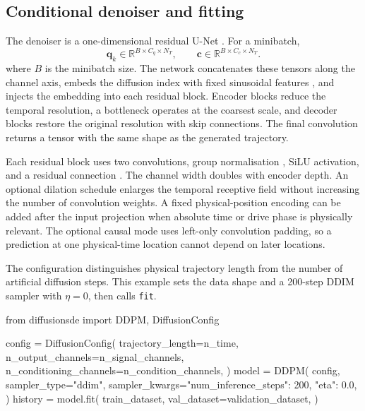 \subsection{Conditional denoiser and fitting}

The denoiser is a one-dimensional residual U-Net \cite{ronneberger2015unet}.
For a minibatch,
\begin{equation}
    \mathbf{q}_k\in\mathbb{R}^{B\times C_q\times N_T},
    \qquad
    \mathbf{c}\in\mathbb{R}^{B\times C_c\times N_T}.
    \label{eq:denoiser_tensor_shapes}
\end{equation}
where $B$ is the minibatch size. The network concatenates these tensors along the
channel axis, embeds the
diffusion index with fixed
sinusoidal features \cite{vaswani2017attention}, and injects the embedding into
each residual block. Encoder blocks reduce the temporal resolution, a bottleneck
operates at the coarsest scale, and decoder blocks restore the original resolution
with skip connections. The final convolution returns a tensor with the same shape
as the generated trajectory.

Each residual block uses two convolutions, group normalisation
\cite{wu2018groupnorm}, SiLU activation, and a residual connection
\cite{he2016residual}. The channel width doubles with encoder depth. An optional
dilation schedule enlarges the temporal receptive field without increasing the
number of convolution weights. A fixed physical-position encoding can be added
after the input projection when absolute time or drive phase is physically
relevant. The optional causal mode uses left-only convolution padding, so a
prediction at one physical-time location cannot depend on later locations.

The configuration distinguishes physical trajectory length from the number of
artificial diffusion steps. This example sets the data shape and a 200-step DDIM
sampler with $\eta=0$, then calls \texttt{fit}.

\begin{pythonlisting}
from diffusionsde import DDPM, DiffusionConfig

config = DiffusionConfig(
    trajectory_length=n_time,
    n_output_channels=n_signal_channels,
    n_conditioning_channels=n_condition_channels,
)
model = DDPM(
    config,
    sampler_type="ddim",
    sampler_kwargs={"num_inference_steps": 200, "eta": 0.0},
)
history = model.fit(
    train_dataset,
    val_dataset=validation_dataset,
)
\end{pythonlisting}

